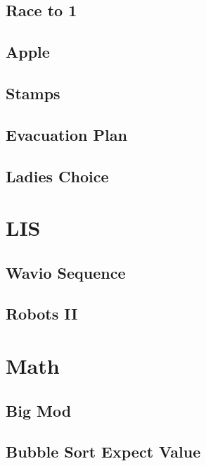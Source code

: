         \subsection{Race to 1}
                
        \subsection{Apple}
                
        \subsection{Stamps}
                
        \subsection{Evacuation Plan}
                
        \subsection{Ladies Choice}
                

\section{LIS}
        \subsection{Wavio Sequence}
                
        \subsection{Robots II}
                

\section{Math}
        \subsection{Big Mod}
                
        \subsection{Bubble Sort Expect Value}
                

